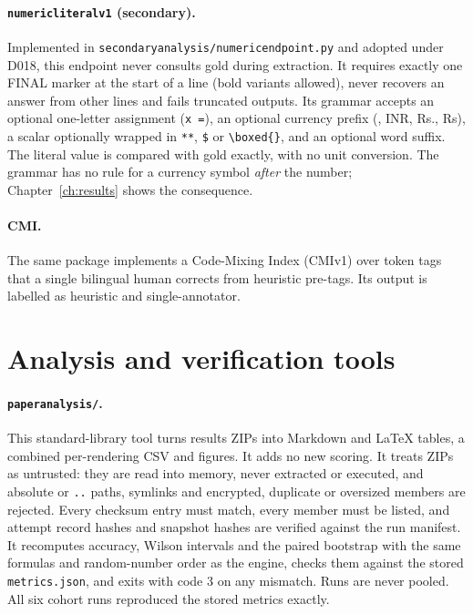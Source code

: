 \documentclass[12pt,a4paper,oneside]{report}
\renewcommand{\_}{\oldunderscore\allowbreak}
\newcommand{\rs}{\rupee}
\begin{document}
\paragraph{\texttt{numeric\_literal\_v1} (secondary).} Implemented in \texttt{secondary\_analysis/numeric\_endpoint.py} and adopted under D018, this endpoint never consults gold during extraction. It requires exactly one FINAL marker at the start of a line (bold variants allowed), never recovers an answer from other lines and fails truncated outputs. Its grammar accepts an optional one-letter assignment (\texttt{x =}), an optional currency prefix (\rs, INR, Rs., Rs), a scalar optionally wrapped in \texttt{**}, \texttt{\$} or \verb|\boxed{}|, and an optional word suffix. The literal value is compared with gold exactly, with no unit conversion. The grammar has no rule for a currency symbol \emph{after} the number; Chapter~\ref{ch:results} shows the consequence.

\paragraph{CMI.} The same package implements a Code-Mixing Index (CMI\_v1) over token tags that a single bilingual human corrects from heuristic pre-tags. Its output is labelled as heuristic and single-annotator.

\section{Analysis and verification tools}

\paragraph{\texttt{paper\_analysis/}.} This standard-library tool turns results ZIPs into Markdown and LaTeX tables, a combined per-rendering CSV and figures. It adds no new scoring. It treats ZIPs as untrusted: they are read into memory, never extracted or executed, and absolute or \texttt{..} paths, symlinks and encrypted, duplicate or oversized members are rejected. Every checksum entry must match, every member must be listed, and attempt record hashes and snapshot hashes are verified against the run manifest. It recomputes accuracy, Wilson intervals and the paired bootstrap with the same formulas and random-number order as the engine, checks them against the stored \texttt{metrics.json}, and exits with code 3 on any mismatch. Runs are never pooled. All six cohort runs reproduced the stored metrics exactly.
\end{document}
